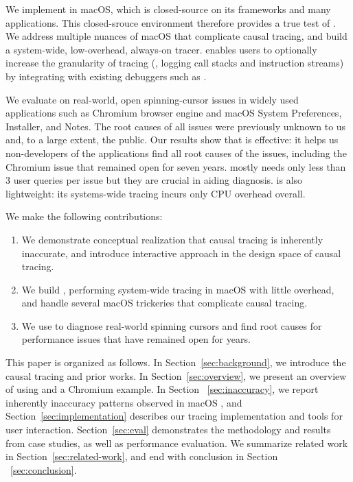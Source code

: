 We implement \xxx in macOS, which is closed-source on its frameworks and many
applications. This closed-srouce environment therefore provides a true test
of \xxx. We address multiple nuances of macOS that complicate causal tracing,
and build a system-wide, low-overhead, always-on tracer. \xxx enables users to
optionally increase the granularity of tracing (\eg, logging call stacks and
instruction streams) by integrating with existing debuggers such as .

We evaluate \xxx on \nbug real-world, open spinning-cursor issues in widely
used applications such as Chromium browser engine and macOS System Preferences,
Installer, and Notes. The root causes of all \nbug issues were previously
unknown to us and, to a large extent, the public. Our results show that \xxx is
effective: it helps us non-developers of the applications find all root causes
of the issues, including the Chromium issue that remained open for seven years.
\xxx mostly needs only less than 3 user queries per issue but they are crucial
in aiding diagnosis. \xxx is also lightweight: its systems-wide tracing incurs
only \cpuoverhead CPU overhead overall.


We make the following contributions: 
\begin{enumerate}

\item We demonstrate conceptual realization that causal tracing is inherently
inaccurate, and introduce interactive approach in the design space of causal 
tracing.

\item We build \xxx, performing system-wide tracing in macOS with little
overhead, and handle several macOS trickeries that complicate causal tracing.

\item We use \xxx to diagnose real-world spinning cursors and find root causes for
performance issues that have remained open for years.

\end{enumerate}

This paper is organized as follows. In Section~\ref{sec:background}, we
introduce the causal tracing and prior works. In Section~\ref{sec:overview},
we present an overview of using \xxx and a Chromium example. In
Section ~\ref{sec:inaccuracy}, we report inherently inaccuracy
patterns observed in macOS , and Section~\ref{sec:implementation}
describes our tracing implementation and tools for user interaction.
Section~\ref{sec:eval} demonstrates the methodology and results from case
studies, as well as performance evaluation. We summarize related work
in Section~\ref{sec:related-work}, and end with conclusion in Section
~\ref{sec:conclusion}.
